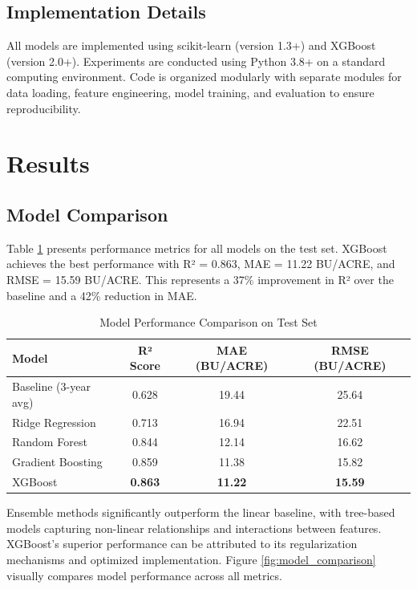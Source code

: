 \documentclass[conference]{IEEEtran}
\begin{document}
\subsection{Implementation Details}

All models are implemented using scikit-learn (version 1.3+) and XGBoost (version 2.0+). Experiments are conducted using Python 3.8+ on a standard computing environment. Code is organized modularly with separate modules for data loading, feature engineering, model training, and evaluation to ensure reproducibility.

\section{Results}

\subsection{Model Comparison}

Table \ref{tab:model_comparison} presents performance metrics for all models on the test set. XGBoost achieves the best performance with R² = 0.863, MAE = 11.22 BU/ACRE, and RMSE = 15.59 BU/ACRE. This represents a 37\% improvement in R² over the baseline and a 42\% reduction in MAE.

\begin{table}[htbp]
\caption{Model Performance Comparison on Test Set}
\label{tab:model_comparison}
\centering
\begin{tabular}{lccc}
\toprule
Model & R² Score & MAE (BU/ACRE) & RMSE (BU/ACRE) \\
\midrule
Baseline (3-year avg) & 0.628 & 19.44 & 25.64 \\
Ridge Regression & 0.713 & 16.94 & 22.51 \\
Random Forest & 0.844 & 12.14 & 16.62 \\
Gradient Boosting & 0.859 & 11.38 & 15.82 \\
XGBoost & \textbf{0.863} & \textbf{11.22} & \textbf{15.59} \\
\bottomrule
\end{tabular}
\end{table}

Ensemble methods significantly outperform the linear baseline, with tree-based models capturing non-linear relationships and interactions between features. XGBoost's superior performance can be attributed to its regularization mechanisms and optimized implementation. Figure \ref{fig:model_comparison} visually compares model performance across all metrics.
\end{document}
